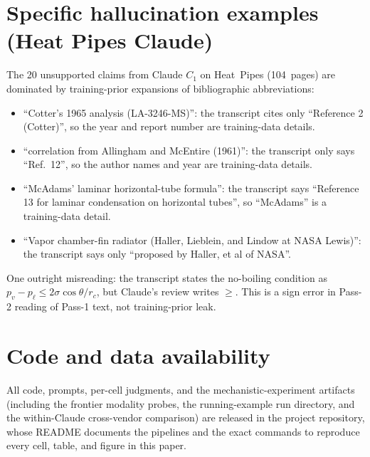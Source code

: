 \documentclass[11pt]{article}
\begin{document}
\section{Specific hallucination examples (Heat Pipes Claude)}
\label{appdx:examples}

The 20 unsupported claims from Claude $C_1$ on Heat~Pipes (104~pages) are dominated by training-prior expansions of bibliographic abbreviations:

\begin{itemize}
\itemsep0pt
\item ``Cotter's 1965 analysis (LA-3246-MS)'': the transcript cites only ``Reference 2 (Cotter)'', so the year and report number are training-data details.
\item ``correlation from Allingham and McEntire (1961)'': the transcript only says ``Ref.~12'', so the author names and year are training-data details.
\item ``McAdams' laminar horizontal-tube formula'': the transcript says ``Reference 13 for laminar condensation on horizontal tubes'', so ``McAdams'' is a training-data detail.
\item ``Vapor chamber-fin radiator (Haller, Lieblein, and Lindow at NASA Lewis)'': the transcript says only ``proposed by Haller, et al of NASA''.
\end{itemize}

One outright misreading: the transcript states the no-boiling condition as $p_v - p_\ell \le 2\sigma\cos\theta/r_c$, but Claude's review writes $\ge$. This is a sign error in Pass-2 reading of Pass-1 text, not training-prior leak.

\section{Code and data availability}
\label{sec:code}
\label{appdx:code}

\begin{sloppypar}
All code, prompts, per-cell judgments, and the mechanistic-experiment artifacts (including the frontier modality probes, the running-example run directory, and the within-Claude cross-vendor comparison) are released in the project repository, whose README documents the pipelines and the exact commands to reproduce every cell, table, and figure in this paper.
\end{sloppypar}
\end{document}
